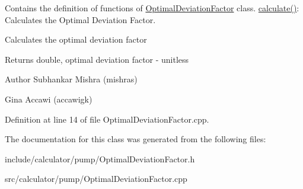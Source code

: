 Contains the definition of functions of \hyperlink{class_optimal_deviation_factor}{Optimal\+Deviation\+Factor} class. \hyperlink{class_optimal_deviation_factor_aaa6687bb46d275c4cbcfe44caf895a37}{calculate()}\+: Calculates the Optimal Deviation Factor. 

Calculates the optimal deviation factor \begin{DoxyReturn}{Returns}
double, optimal deviation factor -\/ unitless
\end{DoxyReturn}
\begin{DoxyAuthor}{Author}
Subhankar Mishra (mishras) 

Gina Accawi (accawigk) 
\end{DoxyAuthor}


Definition at line 14 of file Optimal\+Deviation\+Factor.\+cpp.



The documentation for this class was generated from the following files\+:\begin{DoxyCompactItemize}
\item 
include/calculator/pump/Optimal\+Deviation\+Factor.\+h\item 
src/calculator/pump/Optimal\+Deviation\+Factor.\+cpp\end{DoxyCompactItemize}
